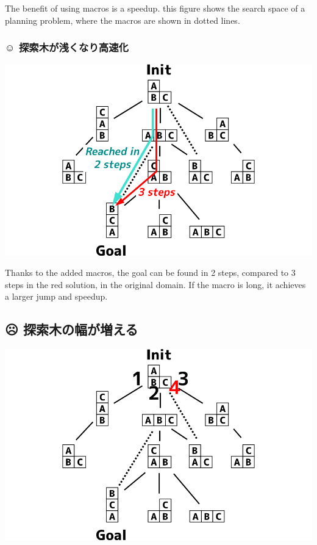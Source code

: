 \begin{resume}
The benefit of using macros is a speedup.
this figure shows the search space of a planning problem, where the macros
are shown in dotted lines.
\end{resume}

\subsubsection{☺ 探索木が浅くなり高速化}
\label{sec-6-4-1}

\includegraphics{img/macro2/search.1.png}

\begin{resume}
Thanks to the added macros, the goal can be found in 2 steps, compared to 3
steps in the red solution, in the original domain.
If the macro is long, it achieves a larger jump and speedup.
\end{resume}

\subsection{☹ 探索木の幅が増える}
\label{sec-6-5}

\includegraphics{img/macro2/search.2.png}

